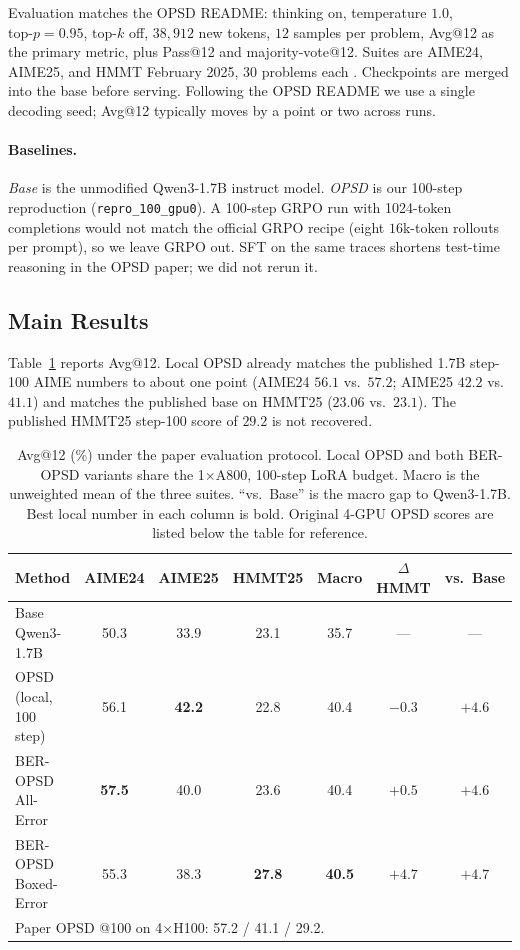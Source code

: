 \documentclass[letterpaper]{article}
\begin{document}
Evaluation matches the OPSD README: thinking on, temperature $1.0$, $\mathrm{top}\text{-}p{=}0.95$, $\mathrm{top}\text{-}k$ off, $38{,}912$ new tokens, $12$ samples per problem, Avg@12 as the primary metric, plus Pass@12 and majority-vote@12. Suites are AIME24, AIME25, and HMMT February 2025, $30$ problems each \cite{aime2024,hmmt2025}. Checkpoints are merged into the base before serving. Following the OPSD README we use a single decoding seed; Avg@12 typically moves by a point or two across runs.

\paragraph{Baselines.}
\emph{Base} is the unmodified Qwen3-1.7B instruct model. \emph{OPSD} is our 100-step reproduction (\texttt{repro\_100\_gpu0}). A 100-step GRPO run with 1024-token completions would not match the official GRPO recipe (eight $16$k-token rollouts per prompt), so we leave GRPO out. SFT on the same traces shortens test-time reasoning in the OPSD paper; we did not rerun it.

\subsection{Main Results}

Table~\ref{tab:main} reports Avg@12. Local OPSD already matches the published 1.7B step-100 AIME numbers to about one point (AIME24 $56.1$ vs.\ $57.2$; AIME25 $42.2$ vs.\ $41.1$) and matches the published base on HMMT25 ($23.06$ vs.\ $23.1$). The published HMMT25 step-100 score of $29.2$ is not recovered.

\begin{table}[t]
\centering
\setlength{\tabcolsep}{3.5pt}
\begin{tabular}{lcccccc}
\hline
Method & AIME24 & AIME25 & HMMT25 & Macro & $\Delta$ HMMT & vs.\ Base \\
\hline
Base Qwen3-1.7B & 50.3 & 33.9 & 23.1 & 35.7 & --- & --- \\
OPSD (local, 100 step) & 56.1 & \textbf{42.2} & 22.8 & 40.4 & $-0.3$ & $+4.6$ \\
BER-OPSD All-Error & \textbf{57.5} & 40.0 & 23.6 & 40.4 & $+0.5$ & $+4.6$ \\
BER-OPSD Boxed-Error & 55.3 & 38.3 & \textbf{27.8} & \textbf{40.5} & $\mathbf{+4.7}$ & $\mathbf{+4.7}$ \\
\hline
\multicolumn{7}{l}{\footnotesize Paper OPSD @100 on 4$\times$H100: 57.2 / 41.1 / 29.2.} \\
\hline
\end{tabular}
\caption{Avg@12 (\%) under the paper evaluation protocol. Local OPSD and both BER-OPSD variants share the 1$\times$A800, 100-step LoRA budget. Macro is the unweighted mean of the three suites. ``vs.\ Base'' is the macro gap to Qwen3-1.7B. Best local number in each column is bold. Original 4-GPU OPSD scores are listed below the table for reference.}
\label{tab:main}
\end{table}
\end{document}
